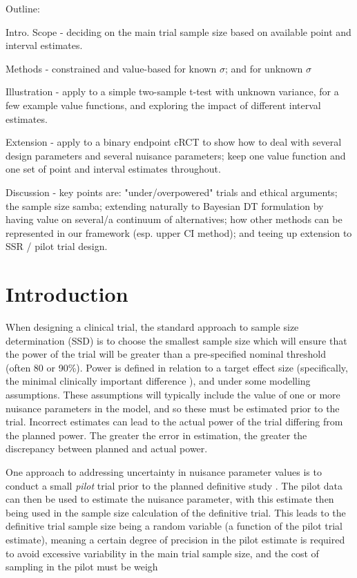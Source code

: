 \documentclass[sagev, Crown]{sagej}
\begin{document}

\maketitle

Outline:

Intro. Scope - deciding on the main trial sample size based on available point and interval estimates.

Methods - constrained and value-based for known $\sigma$; and for unknown $\sigma$

Illustration - apply to a simple two-sample t-test with unknown variance, for a few example value functions, and exploring the impact of different interval estimates.

Extension - apply to a binary endpoint cRCT to show how to deal with several design parameters and several nuisance parameters; keep one value function and one set of point and interval estimates throughout.

Discussion - key points are: "under/overpowered" trials and ethical arguments; the sample size samba; extending naturally to Bayesian DT formulation by having value on several/a continuum of alternatives; how other methods can be represented in our framework (esp. upper CI method); and teeing up extension to SSR / pilot trial design.


\section{Introduction}\label{sec:intro}

When designing a clinical trial, the standard approach to sample size determination (SSD) is to choose the smallest sample size which will ensure that the power of the trial will be greater than a pre-specified nominal threshold (often 80 or 90\%). Power is defined in relation to a target effect size (specifically, the minimal clinically important difference \cite{Cook2018}), and under some modelling assumptions. These assumptions will typically include the value of one or more nuisance parameters in the model, and so these must be estimated prior to the trial. Incorrect estimates can lead to the actual power of the trial differing from the planned power. The greater the error in estimation, the greater the discrepancy between planned and actual power.

One approach to addressing uncertainty in nuisance parameter values is to conduct a small \emph{pilot} trial prior to the planned definitive study \cite{Browne1995, Gould2001, Friede2006}. The pilot data can then be used to estimate the nuisance parameter, with this estimate then being used in the sample size calculation of the definitive trial. This leads to the definitive trial sample size being a random variable (a function of the pilot trial estimate),  meaning a certain degree of precision in the pilot estimate is required to avoid excessive variability in the main trial sample size, and the cost of sampling in the pilot must be weigh
\end{document}
